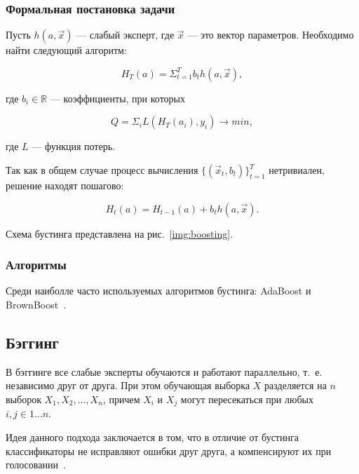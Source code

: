 \subsubsection*{Формальная постановка задачи}

Пусть $h(a, \overrightarrow{x})$ --- слабый эксперт, где $\overrightarrow{x}$ --- это вектор параметров. Необходимо найти следующий алгоритм:

\begin{equation}
H_T(a) = \Sigma_{t=1}^T b_th(a, \overrightarrow{x}),
\end{equation}

где $b_i \in \mathbb{R}$ --- коэффициенты, при которых

\begin{equation}
Q = \Sigma_iL(H_T(a_i), y_i) \to min,
\end{equation}

где $L$ --- функция потерь. 

Так как в общем случае процесс вычисления $\{(\overrightarrow{x}_t, b_t)\}_{t=1}^T$ нетривиален, решение находят пошагово:

\begin{equation}
H_t(a) = H_{t-1}(a) + b_th(a, \overrightarrow{x}).
\end{equation}

Схема бустинга представлена на рис.~\ref{img:boosting}.


\subsubsection*{Алгоритмы}

Среди наиболле часто используемых алгоритмов бустинга: AdaBoost и BrownBoost~\cite{ensembles}.

\subsection{Бэггинг}

В бэггинге все слабые эксперты обучаются и работают параллельно, т.~е. независимо друг от друга. При этом обучающая выборка $X$ разделяется на $n$ выборок $X_1, X_2, \dots, X_n$, причем $X_i$ и $X_j$ могут пересекаться при любых $i,j \in 1 \dots n$.

Идея данного подхода заключается в том, что в отличие от бустинга классификаторы не исправляют ошибки друг друга, а компенсируют их при голосовании~\cite{ensembles}. 

